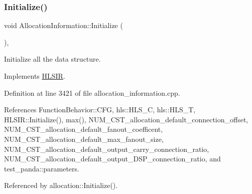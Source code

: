 \subsubsection{\texorpdfstring{Initialize()}{Initialize()}}
{\footnotesize\ttfamily void Allocation\+Information\+::\+Initialize (\begin{DoxyParamCaption}{ }\end{DoxyParamCaption})\hspace{0.3cm}{\ttfamily [override]}, {\ttfamily [virtual]}}



Initialize all the data structure. 



Implements \hyperlink{classHLSIR_a37c3471e94bbb635d9fac51cca161225}{H\+L\+S\+IR}.



Definition at line 3421 of file allocation\+\_\+information.\+cpp.



References Function\+Behavior\+::\+C\+FG, hls\+::\+H\+L\+S\+\_\+C, hls\+::\+H\+L\+S\+\_\+T, H\+L\+S\+I\+R\+::\+Initialize(), max(), N\+U\+M\+\_\+\+C\+S\+T\+\_\+allocation\+\_\+default\+\_\+connection\+\_\+offset, N\+U\+M\+\_\+\+C\+S\+T\+\_\+allocation\+\_\+default\+\_\+fanout\+\_\+coefficent, N\+U\+M\+\_\+\+C\+S\+T\+\_\+allocation\+\_\+default\+\_\+max\+\_\+fanout\+\_\+size, N\+U\+M\+\_\+\+C\+S\+T\+\_\+allocation\+\_\+default\+\_\+output\+\_\+carry\+\_\+connection\+\_\+ratio, N\+U\+M\+\_\+\+C\+S\+T\+\_\+allocation\+\_\+default\+\_\+output\+\_\+\+D\+S\+P\+\_\+connection\+\_\+ratio, and test\+\_\+panda\+::parameters.



Referenced by allocation\+::\+Initialize().

